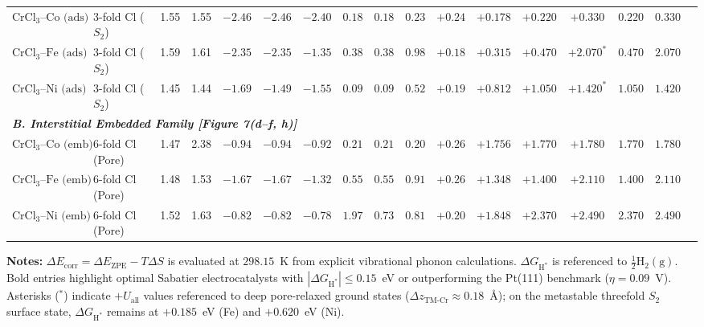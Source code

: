 \begin{table}[htbp]
\begin{adjustbox}{max width=\textwidth}
\begin{tabular}{llccccccccccccccc}
      $\text{CrCl}_3\text{--Co (ads)}$ & 3-fold Cl ($S_2$) & 1.55 & 1.55 & $-2.46$ & $-2.46$ & $-2.40$ & $0.18$ & $0.18$ & $0.23$ & $+0.24$ & $+0.178$ & $\mathbf{+0.220}$ & $\mathbf{+0.330}$ & $\mathbf{0.220}$ & $\mathbf{0.330}$ \\
      $\text{CrCl}_3\text{--Fe (ads)}$ & 3-fold Cl ($S_2$) & 1.59 & 1.61 & $-2.35$ & $-2.35$ & $-1.35$ & $0.38$ & $0.38$ & $0.98$ & $+0.18$ & $+0.315$ & $\mathbf{+0.470}$ & $+2.070^*$        & $0.470$          & $2.070$ \\
      $\text{CrCl}_3\text{--Ni (ads)}$ & 3-fold Cl ($S_2$) & 1.45 & 1.44 & $-1.69$ & $-1.49$ & $-1.55$ & $0.09$ & $0.09$ & $0.52$ & $+0.19$ & $+0.812$ & $+1.050$          & $+1.420^*$        & $1.050$          & $1.420$ \\
      \midrule
      \multicolumn{16}{l}{\textit{\textbf{B. Interstitial Embedded Family [Figure 7(d--f, h)]}}} \\
      $\text{CrCl}_3\text{--Co (emb)}$ & 6-fold Cl (Pore)  & 1.47 & 2.38 & $-0.94$ & $-0.94$ & $-0.92$ & $0.21$ & $0.21$ & $0.20$ & $+0.26$ & $+1.756$ & $+1.770$          & $+1.780$          & $1.770$          & $1.780$ \\
      $\text{CrCl}_3\text{--Fe (emb)}$ & 6-fold Cl (Pore)  & 1.48 & 1.53 & $-1.67$ & $-1.67$ & $-1.32$ & $0.55$ & $0.55$ & $0.91$ & $+0.26$ & $+1.348$ & $+1.400$          & $+2.110$          & $1.400$          & $2.110$ \\
      $\text{CrCl}_3\text{--Ni (emb)}$ & 6-fold Cl (Pore)  & 1.52 & 1.63 & $-0.82$ & $-0.82$ & $-0.78$ & $1.97$ & $0.73$ & $0.81$ & $+0.20$ & $+1.848$ & $+2.370$          & $+2.490$          & $2.370$          & $2.490$ \\
      \bottomrule
    \end{tabular}
  \end{adjustbox}
  \vspace{1ex}
  \begin{minipage}{0.98\textwidth}
    \footnotesize
    \textbf{Notes:} $\Delta E_{\text{corr}} = \Delta E_{\text{ZPE}} - T\Delta S$ is evaluated at $298.15$~K from explicit vibrational phonon calculations. $\Delta G_{\text{H}^*}$ is referenced to $\frac{1}{2}\text{H}_2(\text{g})$. Bold entries highlight optimal Sabatier electrocatalysts with $|\Delta G_{\text{H}^*}| \le 0.15$~eV or outperforming the Pt(111) benchmark ($\eta = 0.09$~V). Asterisks ($^*$) indicate $+U_{\text{all}}$ values referenced to deep pore-relaxed ground states ($\Delta z_{\text{TM-Cr}} \approx 0.18$~\AA); on the metastable threefold $S_2$ surface state, $\Delta G_{\text{H}^*}$ remains at $+0.185$~eV (Fe) and $+0.620$~eV (Ni).
  \end{minipage}
\end{table}
